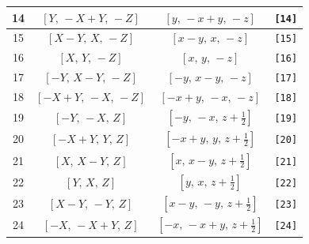 \documentclass[fleqn,8pt]{jsarticle}
\begin{document}
\begin{longtable}{cccc}
14 & $\left[ Y,\, - X + Y,\, - Z \right]$ & $\left[ y,\, - x + y,\, - z \right]$ & {\tt [14]} \\ \hline
15 & $\left[ X - Y,\, X,\, - Z \right]$ & $\left[ x - y,\, x,\, - z \right]$ & {\tt [15]} \\ \hline
16 & $\left[ X,\, Y,\, - Z \right]$ & $\left[ x,\, y,\, - z \right]$ & {\tt [16]} \\ \hline
17 & $\left[ - Y,\, X - Y,\, - Z \right]$ & $\left[ - y,\, x - y,\, - z \right]$ & {\tt [17]} \\ \hline
18 & $\left[ - X + Y,\, - X,\, - Z \right]$ & $\left[ - x + y,\, - x,\, - z \right]$ & {\tt [18]} \\ \hline
19 & $\left[ - Y,\, - X,\, Z \right]$ & $\left[ - y,\, - x,\, z + \frac{1}{2} \right]$ & {\tt [19]} \\ \hline
20 & $\left[ - X + Y,\, Y,\, Z \right]$ & $\left[ - x + y,\, y,\, z + \frac{1}{2} \right]$ & {\tt [20]} \\ \hline
21 & $\left[ X,\, X - Y,\, Z \right]$ & $\left[ x,\, x - y,\, z + \frac{1}{2} \right]$ & {\tt [21]} \\ \hline
22 & $\left[ Y,\, X,\, Z \right]$ & $\left[ y,\, x,\, z + \frac{1}{2} \right]$ & {\tt [22]} \\ \hline
23 & $\left[ X - Y,\, - Y,\, Z \right]$ & $\left[ x - y,\, - y,\, z + \frac{1}{2} \right]$ & {\tt [23]} \\ \hline
24 & $\left[ - X,\, - X + Y,\, Z \right]$ & $\left[ - x,\, - x + y,\, z + \frac{1}{2} \right]$ & {\tt [24]} \\
\end{longtable}
\end{document}
